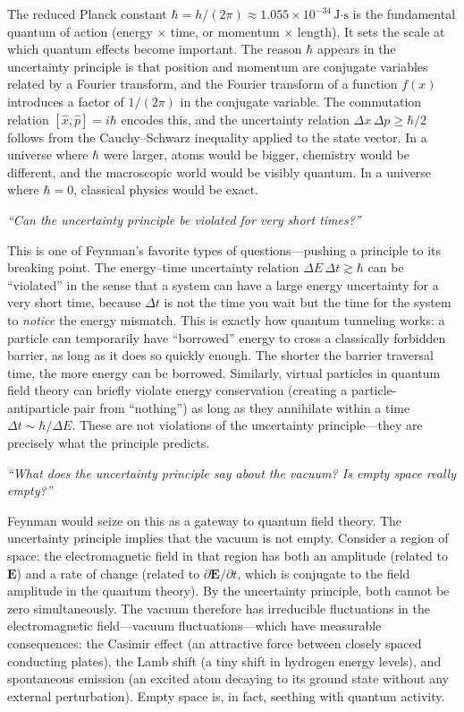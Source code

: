 The reduced Planck constant $\hbar = h/(2\pi) \approx 1.055 \times 10^{-34}\,\text{J·s}$ is the fundamental quantum of action (energy $\times$ time, or momentum $\times$ length). It sets the scale at which quantum effects become important. The reason $\hbar$ appears in the uncertainty principle is that position and momentum are conjugate variables related by a Fourier transform, and the Fourier transform of a function $f(x)$ introduces a factor of $1/(2\pi)$ in the conjugate variable. The commutation relation $[\hat{x},\hat{p}] = i\hbar$ encodes this, and the uncertainty relation $\Delta x\,\Delta p \geq \hbar/2$ follows from the Cauchy--Schwarz inequality applied to the state vector. In a universe where $\hbar$ were larger, atoms would be bigger, chemistry would be different, and the macroscopic world would be visibly quantum. In a universe where $\hbar = 0$, classical physics would be exact.

\textit{``Can the uncertainty principle be violated for very short times?''}

This is one of Feynman's favorite types of questions---pushing a principle to its breaking point. The energy--time uncertainty relation $\Delta E\,\Delta t \gtrsim \hbar$ can be ``violated'' in the sense that a system can have a large energy uncertainty for a very short time, because $\Delta t$ is not the time you wait but the time for the system to \emph{notice} the energy mismatch. This is exactly how quantum tunneling works: a particle can temporarily have ``borrowed'' energy to cross a classically forbidden barrier, as long as it does so quickly enough. The shorter the barrier traversal time, the more energy can be borrowed. Similarly, virtual particles in quantum field theory can briefly violate energy conservation (creating a particle-antiparticle pair from ``nothing'') as long as they annihilate within a time $\Delta t \sim \hbar/\Delta E$. These are not violations of the uncertainty principle---they are precisely what the principle predicts.

\textit{``What does the uncertainty principle say about the vacuum? Is empty space really empty?''}

Feynman would seize on this as a gateway to quantum field theory. The uncertainty principle implies that the vacuum is not empty. Consider a region of space: the electromagnetic field in that region has both an amplitude (related to $\mathbf{E}$) and a rate of change (related to $\partial\mathbf{E}/\partial t$, which is conjugate to the field amplitude in the quantum theory). By the uncertainty principle, both cannot be zero simultaneously. The vacuum therefore has irreducible fluctuations in the electromagnetic field---vacuum fluctuations---which have measurable consequences: the Casimir effect (an attractive force between closely spaced conducting plates), the Lamb shift (a tiny shift in hydrogen energy levels), and spontaneous emission (an excited atom decaying to its ground state without any external perturbation). Empty space is, in fact, seething with quantum activity.

